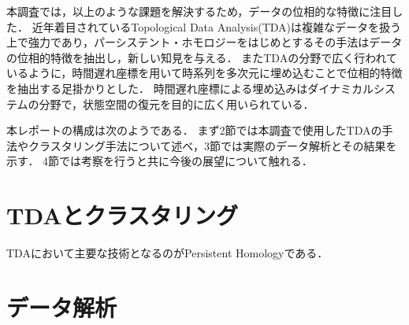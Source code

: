 \documentclass{jarticle}
\begin{document}
本調査では，以上のような課題を解決するため，データの位相的な特徴に注目した．
近年着目されているTopological Data Analysis(TDA)は複雑なデータを扱う上で強力であり，パーシステント・ホモロジーをはじめとするその手法はデータの位相的特徴を抽出し，新しい知見を与える．
またTDAの分野で広く行われているように，時間遅れ座標を用いて時系列を多次元に埋め込むことで位相的特徴を抽出する足掛かりとした．
時間遅れ座標による埋め込みはダイナミカルシステムの分野で，状態空間の復元を目的に広く用いられている．

本レポートの構成は次のようである．
まず2節では本調査で使用したTDAの手法やクラスタリング手法について述べ，3節では実際のデータ解析とその結果を示す．
4節では考察を行うと共に今後の展望について触れる．

\section{TDAとクラスタリング}
TDAにおいて主要な技術となるのがPersistent Homology\cite{Edelsbrunner2002}である．



\section{データ解析}
\end{document}
